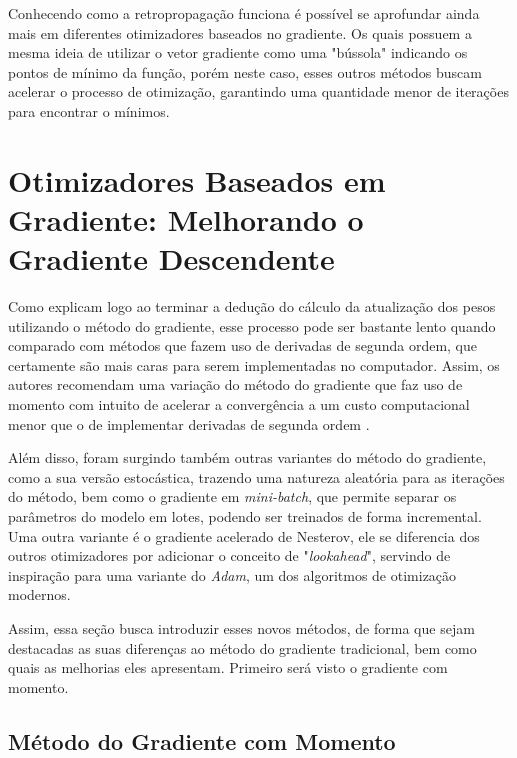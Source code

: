 Conhecendo como a retropropagação funciona é possível se aprofundar ainda mais em diferentes otimizadores baseados no gradiente. Os quais possuem a mesma ideia de utilizar o vetor gradiente como uma "bússola" indicando os pontos de mínimo da função, porém neste caso, esses outros métodos buscam acelerar o processo de otimização, garantindo uma quantidade menor de iterações para encontrar o mínimos.


\section{Otimizadores Baseados em Gradiente: Melhorando o Gradiente Descendente}

Como \textcite{BackpropagationArticle} explicam logo ao terminar a dedução do cálculo da atualização dos pesos utilizando o método do gradiente, esse processo pode ser bastante lento quando comparado com métodos que fazem uso de derivadas de segunda ordem, que certamente são mais caras para serem implementadas no computador. Assim, os autores recomendam uma variação do método do gradiente que faz uso de momento com intuito de acelerar a convergência a um custo computacional menor que o de implementar derivadas de segunda ordem \parencite{BackpropagationArticle}.

Além disso, foram surgindo também outras variantes do método do gradiente, como a sua versão estocástica, trazendo uma natureza aleatória para as iterações do método, bem como o gradiente em \textit{mini-batch}, que permite separar os parâmetros do modelo em lotes, podendo ser treinados de forma incremental. Uma outra variante é o gradiente acelerado de Nesterov, ele se diferencia dos outros otimizadores por adicionar o conceito de "\textit{lookahead}", servindo de inspiração para uma variante do \textit{Adam}, um dos algoritmos de otimização modernos.

Assim, essa seção busca introduzir esses novos métodos, de forma que sejam destacadas as suas diferenças ao método do gradiente tradicional, bem como quais as melhorias eles apresentam. Primeiro será visto o gradiente com momento.

\subsection{Método do Gradiente com Momento} 

